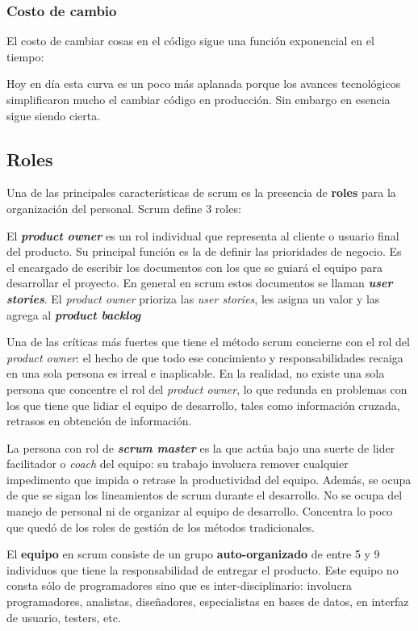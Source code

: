 \documentclass[]{article}
\begin{document}

\subsubsection{Costo de cambio}
El costo de cambiar cosas en el código sigue una función exponencial en el tiempo:

Hoy en día esta curva es un poco más aplanada porque los avances tecnológicos simplificaron mucho el cambiar código en producción. Sin embargo en esencia sigue siendo cierta.

\subsection{Roles}
Una de las principales características de scrum es la presencia de \textbf{roles} para la organización del personal. Scrum define 3 roles:

El \textbf{\emph{product owner}} es un rol individual que representa al cliente o usuario final del producto. Su principal función es la de definir las prioridades de negocio. Es el encargado de escribir los documentos con los que se guiará el equipo para desarrollar el proyecto. En general en scrum estos documentos se llaman \emph{\textbf{user stories}}. El \emph{product owner} prioriza las \emph{user stories}, les asigna un valor y las agrega al \emph{\textbf{product backlog}}

Una de las críticas más fuertes que tiene el método scrum concierne con el rol del \emph{product owner}: el hecho de que todo ese concimiento y responsabilidades recaiga en una sola persona es irreal e inaplicable. En la realidad, no existe una sola persona que concentre el rol del \emph{product owner}, lo que redunda en problemas con los que tiene que lidiar el equipo de desarrollo, tales como información cruzada, retrasos en obtención de información.

La persona con rol de \emph{\textbf{scrum master}} es la que actúa bajo una suerte de lider facilitador o \emph{coach} del equipo: su trabajo involucra remover cualquier impedimento que impida o retrase la productividad del equipo. Además, se ocupa de que se sigan los lineamientos de scrum durante el desarrollo. No se ocupa del manejo de personal ni de organizar al equipo de desarrollo. Concentra lo poco que quedó de los roles de gestión de los métodos tradicionales.


El \textbf{equipo} en scrum consiste de un grupo \textbf{auto-organizado} de entre 5 y 9 individuos que tiene la responsabilidad de entregar el producto. Este equipo no consta sólo de programadores sino que es inter-disciplinario: involucra programadores, analistas, diseñadores, especialistas en bases de datos, en interfaz de usuario, testers, etc.
\end{document}
